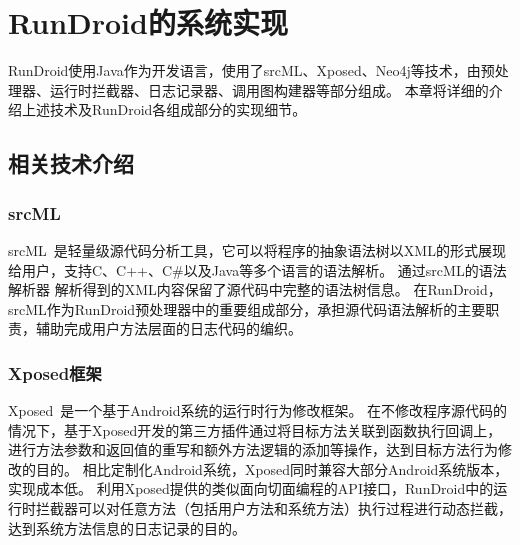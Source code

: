 \chapter{RunDroid的系统实现 }
\label{chp:implement}


RunDroid使用Java作为开发语言，使用了srcML、Xposed、Neo4j等技术，由预处理器、运行时拦截器、日志记录器、调用图构建器等部分组成。
本章将详细的介绍上述技术及RunDroid各组成部分的实现细节。


\section{相关技术介绍}


\subsection{srcML}


srcML~\cite{collard2013srcml}是轻量级源代码分析工具，它可以将程序的抽象语法树以XML的形式展现给用户，支持C、C++、C\#以及Java等多个语言的语法解析。
通过srcML的语法解析器
解析得到的XML内容保留了源代码中完整的语法树信息。
在RunDroid，srcML作为RunDroid预处理器中的重要组成部分，承担源代码语法解析的主要职责，辅助完成用户方法层面的日志代码的编织。
\subsection{Xposed框架}




Xposed~\cite{Xposed}是一个基于Android系统的运行时行为修改框架。
在不修改程序源代码的情况下，基于Xposed开发的第三方插件通过将目标方法关联到函数执行回调上，进行方法参数和返回值的重写和额外方法逻辑的添加等操作，达到目标方法行为修改的目的。
相比定制化Android系统，Xposed同时兼容大部分Android系统版本，实现成本低。
利用Xposed提供的类似面向切面编程的API接口，RunDroid中的运行时拦截器可以对任意方法（包括用户方法和系统方法）执行过程进行动态拦截，达到系统方法信息的日志记录的目的。


